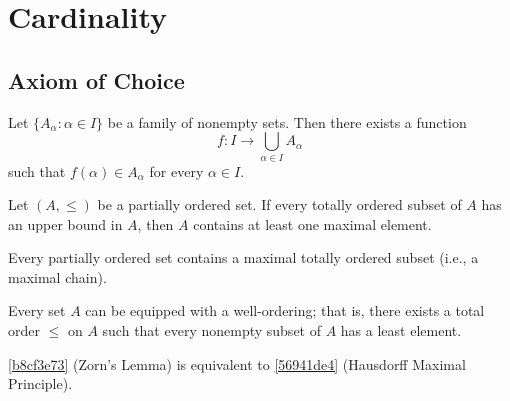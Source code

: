 \section{Cardinality}

\subsection{Axiom of Choice}

\begin{thm}\label{4ed30899}
    Let $\{A_{\alpha} : \alpha \in I\}$ be a family of nonempty sets. 
    Then there exists a function 
    \[
        f : I \to \bigcup_{\alpha \in I} A_{\alpha}
    \]
    such that $f(\alpha) \in A_{\alpha}$ for every $\alpha \in I$.
\end{thm}

\begin{thm}\label{b8cf3e73}
    Let $(A,\leq)$ be a partially ordered set. 
    If every totally ordered subset of $A$ has an upper bound in $A$, 
    then $A$ contains at least one maximal element.
\end{thm}

\begin{thm}\label{56941de4}
    Every partially ordered set contains a maximal totally ordered subset 
    (i.e., a maximal chain).
\end{thm}

\begin{thm}\label{7930915a}
    Every set $A$ can be equipped with a well-ordering; that is, 
    there exists a total order $\leq$ on $A$ such that every nonempty 
    subset of $A$ has a least element.
\end{thm}

\begin{thm}
\cref{b8cf3e73} (Zorn's Lemma) is equivalent to \cref{56941de4} (Hausdorff Maximal Principle).
\end{thm}

